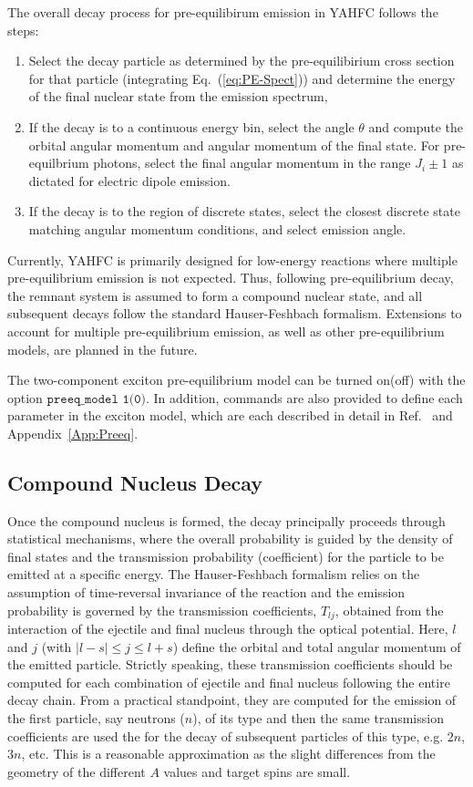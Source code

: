 \documentclass[
10pt,
showpacs,preprintnumbers,footinbib,
amsfonts,amsmath,amssymb,
aps,
prc,twocolumn,groupedaddress,superscriptaddress,
showkeys,
nofootinbib
]{revtex4-1}
\begin{document}
The overall decay process for pre-equilibirum emission in YAHFC follows the steps:
\begin{enumerate}
\item Select the decay particle as determined by the pre-equilibirium cross section for that particle (integrating Eq.~(\ref{eq:PE-Spect})) and determine the energy of the final nuclear state from the emission spectrum,
\item If the decay is to a continuous energy bin, select the angle $\theta$ and compute the orbital angular momentum and angular momentum of the final state. For pre-equilbrium photons, select the final angular momentum in the range $J_i \pm 1$ as dictated for electric dipole emission.
\item If the decay is to the region of discrete states, select the closest discrete state matching angular momentum conditions, and select emission angle.
\end{enumerate}

Currently, YAHFC is primarily designed for low-energy reactions where multiple pre-equilibrium emission is not expected. Thus, following pre-equilibrium decay, the remnant system is assumed to form a compound nuclear state, and all subsequent decays follow the standard Hauser-Feshbach formalism. Extensions to account for multiple pre-equilibrium emission, as well as other pre-equilibrium models, are planned in the future.

The two-component exciton pre-equilibrium model can be turned on(off) with the option ${\texttt {preeq\_model 1(0)}}$. In addition, commands are also provided to define each parameter in the exciton model, which are each described in detail in Ref.~\cite{Koning:2004} and Appendix~\ref{App:Preeq}.

\subsection{Compound Nucleus Decay}
Once the compound nucleus is formed, the decay principally proceeds through statistical mechanisms, where the overall probability is guided by the density of final states and the transmission probability (coefficient) for the particle to be emitted at a specific energy. The Hauser-Feshbach formalism relies on the assumption of time-reversal invariance of the reaction and the emission probability is governed by the transmission coefficients, $T_{lj}$, obtained from the interaction of the ejectile and final nucleus through the optical potential. Here, $l$ and $j$ (with $|l-s| \le j \le l+s $) define the orbital and total angular momentum of the emitted particle. Strictly speaking, these transmission coefficients should be computed for each combination of ejectile and final nucleus following the entire decay chain. From a practical standpoint, they are computed for the emission of the first particle, say neutrons ($n$), of its type and then the same transmission coefficients are used the for the decay of subsequent particles of this type, e.g. $2n$, $3n$, etc. This is a reasonable approximation as the slight differences from the geometry of the different $A$ values and target spins are small.
\end{document}
